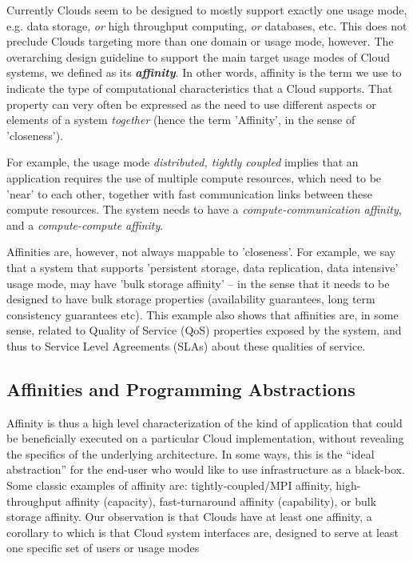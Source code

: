 \documentclass{article}
\newcommand{\I}[1]{\textit{#1}}
\newcommand{\BI}[1]{\textbf{\textit{#1}}}
\newcommand{\up}{\vspace*{-1em}}
\begin{document}
  Currently Clouds seem to be designed to mostly support exactly one
  usage mode, e.g.  data storage, \I{or} high throughput computing,
  \I{or} databases, etc.  This does not preclude Clouds targeting more
  than one domain or usage mode, however.  The overarching design
  guideline to support the main target usage modes of Cloud systems,
  we defined as its \BI{affinity}.  In other words, affinity is the
  term we use to indicate the type of computational characteristics
  that a Cloud supports.  That property can very often be expressed as
  the need to use different aspects or elements of a system
  \I{together} (hence the term 'Affinity', in the sense of
  'closeness').  

  For example, the usage mode \I{distributed, tightly coupled}
  implies that an application requires the use of multiple compute
  resources, which need to be 'near' to each other, together with fast
  communication links between these compute resources.  The system
  needs to have a \I{compute-communication affinity}, and a
  \I{compute-compute affinity}.

  Affinities are, however, not always mappable
  to 'closeness'.  For example, we say that a system that supports
  'persistent storage, data replication, data intensive' usage mode,
  may have 'bulk storage affinity' -- in the sense that it needs to be
  designed to have bulk storage properties (availability guarantees,
  long term consistency guarantees etc).  This example also shows that
  affinities are, in some sense, related to Quality of Service (QoS)
  properties exposed by the system, and thus to Service Level
  Agreements (SLAs) about these qualities of service.


 \up
 \subsection{Affinities and Programming Abstractions}

  Affinity is thus a high level characterization of the kind of
  application that could be beneficially executed on a particular
  Cloud implementation, without revealing the specifics of the
  underlying architecture. In some ways, this is the ``ideal
  abstraction'' for the end-user who would like to use infrastructure
  as a black-box.  Some classic examples of affinity are:
  tightly-coupled/MPI affinity, high-throughput affinity (capacity),
  fast-turnaround affinity (capability), or bulk storage affinity.
  Our observation is that Clouds have at least one affinity, a
  corollary to which is that Cloud system interfaces are, designed to
  serve at least one specific set of users or usage modes
\end{document}
